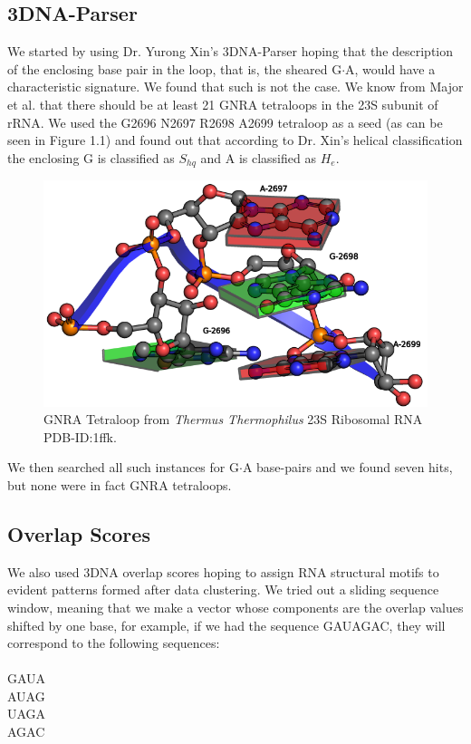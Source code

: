 \subsection{3DNA-Parser}
We started by using Dr. Yurong Xin's 3DNA-Parser hoping that the
description of the enclosing base pair in the loop, that is, the
sheared G$\cdot$A, would have a characteristic signature.
We found that such is not the case. We know from Major et
al. \cite{lemieux2006} that there should be at least 21 GNRA tetraloops
in the 23S subunit of rRNA. We used the G2696 N2697 R2698 A2699
tetraloop as a seed (as can be seen in Figure 1.1) and found out
that according to Dr. Xin's helical classification the enclosing G is
classified as $S_{hq}$ and A is classified as $H_{e}$. 
\begin{figure}[htbp]
\centering 
\includegraphics[angle=0, scale=0.5]{Chapter5/gnra.png}
\caption{GNRA Tetraloop from \textit{Thermus Thermophilus} 23S Ribosomal RNA PDB-ID:1ffk.}
\end{figure}
We then searched all such instances for G$\cdot$A base-pairs and we found seven hits,
but none were in fact GNRA tetraloops.

\subsection{Overlap Scores} 
We also used 3DNA overlap scores hoping to assign RNA structural motifs to
evident patterns formed after data clustering.
We tried out a sliding sequence window, meaning that we make a
vector whose components are the overlap values shifted by one
base, for example, if we had the sequence GAUAGAC, they will
correspond to the following sequences:\\
\\
GAUA\\
AUAG\\
UAGA\\
AGAC\\

